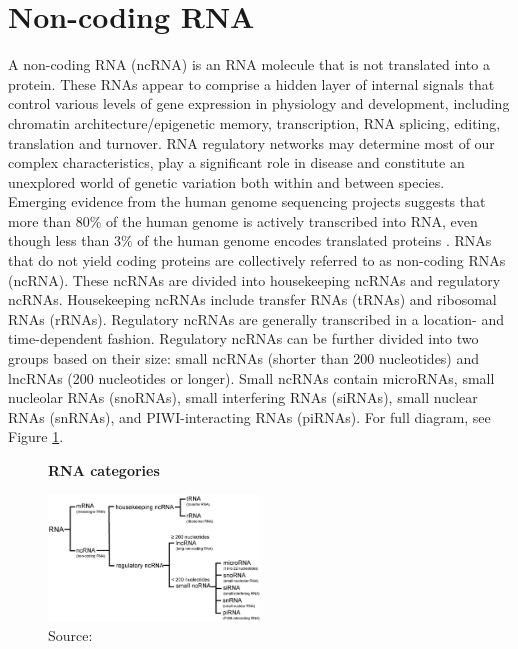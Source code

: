 \section{Non-coding RNA}
A non-coding RNA (ncRNA) is an RNA molecule that is not translated into a protein. These RNAs appear to comprise a hidden layer of internal signals that control various levels of gene expression in physiology and development, including chromatin architecture/epigenetic memory, transcription, RNA splicing, editing, translation and turnover. RNA regulatory networks may determine most of our complex characteristics, play a significant role in disease and constitute an unexplored world of genetic variation both within and between species. \\
Emerging evidence from the human genome sequencing projects suggests that more than 80\% of the human genome is actively transcribed into RNA, even though less than 3\% of the human genome encodes translated proteins \cite{Consortium2012}. RNAs that do not yield coding proteins are collectively referred to as non-coding RNAs (ncRNA). These ncRNAs are divided into housekeeping ncRNAs and regulatory ncRNAs. Housekeeping ncRNAs include transfer RNAs (tRNAs) and ribosomal RNAs (rRNAs). Regulatory ncRNAs are generally transcribed in a location- and time-dependent fashion. Regulatory ncRNAs can be further divided into two groups based on their size: small ncRNAs (shorter than 200 nucleotides) and lncRNAs (200 nucleotides or longer). Small ncRNAs contain microRNAs, small nucleolar RNAs (snoRNAs), small interfering RNAs (siRNAs), small nuclear RNAs (snRNAs), and PIWI-interacting RNAs (piRNAs). For full diagram, see Figure \ref{fig:rnacategories}.

\begin{figure}[h!]
	  \centering
	      	\caption{\textbf{RNA categories}}
	  \label{fig:rnacategories}

  \includegraphics[width=0.5\textwidth]{background figures/cells-06-00012-g001.png}
    	\caption*{Source: \cite{Inamura2017}}
  
\end{figure}

